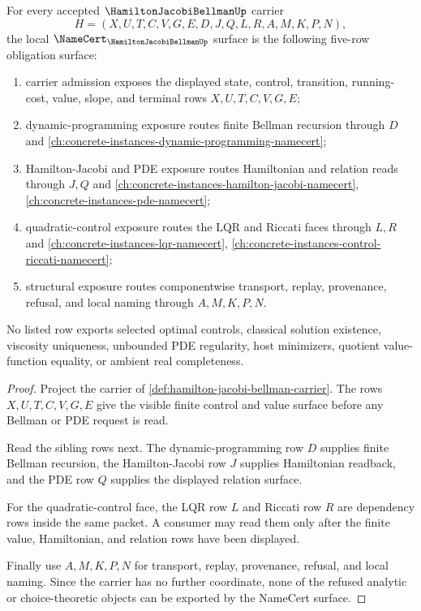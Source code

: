 \begin{theorem}
\label{thm:hamilton-jacobi-bellman-namecert-obligations}
For every accepted $\HamiltonJacobiBellmanUp$ carrier
$$
H=(X,U,T,C,V,G,E,D,J,Q,L,R,A,M,K,P,N),
$$
the local $\NameCert_{\HamiltonJacobiBellmanUp}$ surface is the following five-row obligation surface:
\begin{enumerate}
\item carrier admission exposes the displayed state, control, transition, running-cost, value, slope, and terminal rows $X,U,T,C,V,G,E$;
\item dynamic-programming exposure routes finite Bellman recursion through $D$ and \autoref{ch:concrete-instances-dynamic-programming-namecert};
\item Hamilton-Jacobi and PDE exposure routes Hamiltonian and relation reads through $J,Q$ and \autoref{ch:concrete-instances-hamilton-jacobi-namecert}, \autoref{ch:concrete-instances-pde-namecert};
\item quadratic-control exposure routes the LQR and Riccati faces through $L,R$ and \autoref{ch:concrete-instances-lqr-namecert}, \autoref{ch:concrete-instances-control-riccati-namecert};
\item structural exposure routes componentwise transport, replay, provenance, refusal, and local naming through $A,M,K,P,N$.
\end{enumerate}
No listed row exports selected optimal controls, classical solution existence, viscosity uniqueness, unbounded PDE regularity, host minimizers, quotient value-function equality, or ambient real completeness.
\end{theorem}
\begin{proof}
Project the carrier of \autoref{def:hamilton-jacobi-bellman-carrier}. The rows $X,U,T,C,V,G,E$ give the visible finite control and value surface before any Bellman or PDE request is read.

Read the sibling rows next. The dynamic-programming row $D$ supplies finite Bellman recursion, the Hamilton-Jacobi row $J$ supplies Hamiltonian readback, and the PDE row $Q$ supplies the displayed relation surface.

For the quadratic-control face, the LQR row $L$ and Riccati row $R$ are dependency rows inside the same packet. A consumer may read them only after the finite value, Hamiltonian, and relation rows have been displayed.

Finally use $A,M,K,P,N$ for transport, replay, provenance, refusal, and local naming. Since the carrier has no further coordinate, none of the refused analytic or choice-theoretic objects can be exported by the NameCert surface.
\end{proof}

